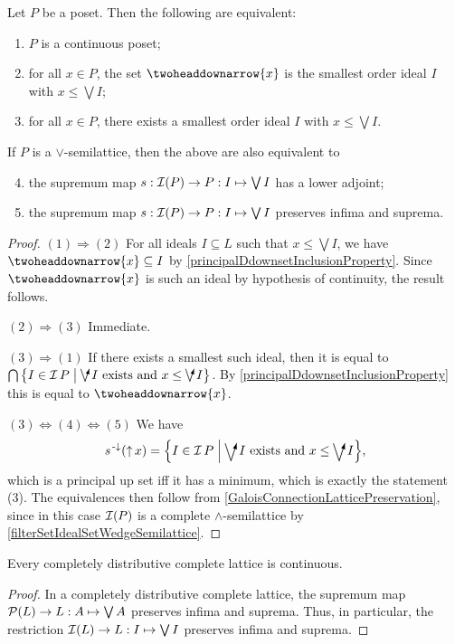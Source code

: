 \begin{proposition}
Let $P$ be a poset. Then the following are equivalent:
\begin{enumerate}
\item $P$ is a continuous poset;
\item for all $x\in P$, the set $\ddownset \{x\}$ is the smallest order ideal $I$ with $x\leq \bigvee I$;
\item for all $x\in P$, there exists a smallest order ideal $I$ with $x\leq \bigvee I$.
\end{enumerate}
If $P$ is a $\vee$-semilattice, then the above are also equivalent to
\begin{enumerate} \setcounter{enumi}{3}
\item the supremum map $s: \operatorname{\mathcal{I}}(P)\to P: I\mapsto \bigvee I$ has a lower adjoint;
\item the supremum map $s: \operatorname{\mathcal{I}}(P)\to P: I\mapsto \bigvee I$ preserves infima and suprema.
\end{enumerate}
\end{proposition}
\begin{proof}
$(1) \Rightarrow (2)$ For all ideals $I\subseteq L$ such that $x\leq \bigvee I$, we have $\ddownset \{x\} \subseteq I$ by \ref{principalDdownsetInclusionProperty}. Since $\ddownset \{x\}$ is such an ideal by hypothesis of continuity, the result follows.

$(2) \Rightarrow (3)$ Immediate.

$(3) \Rightarrow (1)$ If there exists a smallest such ideal, then it is equal to $\bigcap \setbuilder{I\in\ideals{P}}{\text{$\dirvee I$ exists and $x\leq \dirvee I$}}$. By \ref{principalDdownsetInclusionProperty} this is equal to $\ddownset\{x\}$.

$(3) \Leftrightarrow (4) \Leftrightarrow (5)$ We have
\[ s^\preimf(\upset x) = \setbuilder{I\in\ideals{P}}{\text{$\dirvee I$ exists and $x\leq \dirvee I$}}, \]
which is a principal up set iff it has a minimum, which is exactly the statement (3). The equivalences then follow from \ref{GaloisConnectionLatticePreservation}, since in this case $\operatorname{\mathcal{I}}(P)$ is a complete $\wedge$-semilattice by \ref{filterSetIdealSetWedgeSemilattice}.
\end{proof}
\begin{corollary}
Every completely distributive complete lattice is continuous.
\end{corollary}
\begin{proof}
In a completely distributive complete lattice, the supremum map $\operatorname{\mathcal{P}}(L)\to L: A\mapsto \bigvee A$ preserves infima and suprema. Thus, in particular, the restriction $\operatorname{\mathcal{I}}(L)\to L: I\mapsto \bigvee I$ preserves infima and suprema.
\end{proof}


